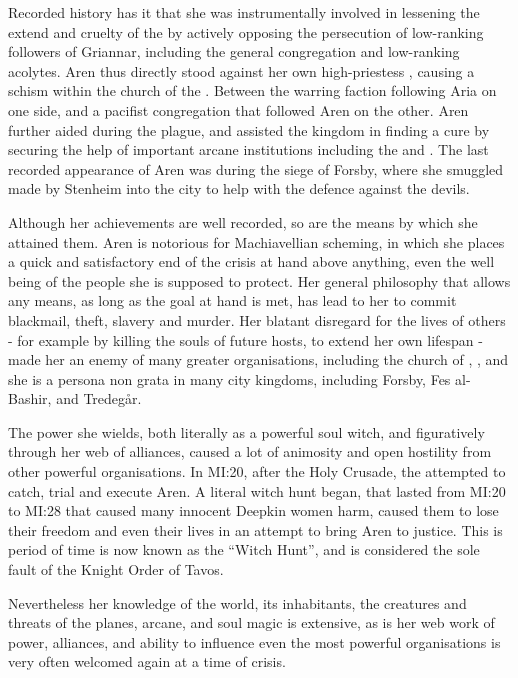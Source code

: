 Recorded history has it that she was instrumentally involved in lessening the
extend and cruelty of the  by actively opposing
the persecution of low-ranking followers of Griannar, including the general
congregation and low-ranking acolytes. Aren thus directly stood against her own
high-priestess , causing a schism within the church of the
. Between the warring faction following Aria on one
side, and a pacifist congregation that followed Aren on the other. Aren
further aided  during the plague, and assisted the
kingdom in finding a cure by securing the help of important arcane
institutions including the  and
. The last recorded appearance of Aren was
during the siege of Forsby, where she smuggled 
made by Stenheim into the city to help with the defence against the devils.

Although her achievements are well recorded, so are the means by which she
attained them. Aren is notorious for Machiavellian scheming, in which she places
a quick and satisfactory end of the crisis at hand above anything, even the
well being of the people she is supposed to protect. Her general philosophy
that allows any means, as long as the goal at hand is met, has lead to her to
commit blackmail, theft, slavery and murder. Her blatant disregard for the lives
of others - for example by killing the souls of future hosts, to extend her
own lifespan - made her an enemy of many greater organisations, including the
church of , , and she is a persona non
grata in many city kingdoms, including Forsby, Fes al-Bashir, and Tredegår.

\label{sec:Witch Hunt}
The power she wields, both literally as a powerful soul witch, and
figuratively through her web of alliances, caused a lot of animosity and open
hostility from other powerful organisations. In MI:20, after the Holy Crusade,
the  attempted to catch, trial and execute
Aren. A literal witch hunt began, that lasted from MI:20 to MI:28 that caused
many innocent Deepkin women harm, caused them to lose their freedom and even
their lives in an attempt to bring Aren to justice. This is period of time is
now known as the ``Witch Hunt'', and is considered the sole fault of the Knight
Order of Tavos.

Nevertheless her knowledge of the world, its inhabitants, the creatures and
threats of the planes, arcane, and soul magic is extensive, as is her web
work of power, alliances, and ability to influence even the most powerful
organisations is very often welcomed again at a time of crisis.

